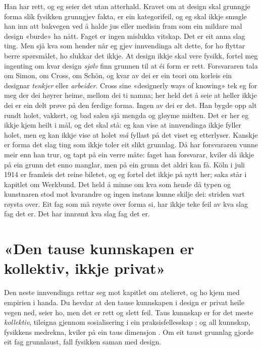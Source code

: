 Han har rett, og eg seier det utan atterhald. Kravet om at design skal grunngje forma slik fysikken grunngjev fakta, er ein kategorifeil, og eg skal ikkje smugle han inn att bakvegen ved å halde jus eller medisin fram som ein mildare mal design «burde» ha nått. Faget er ingen mislukka vitskap. Det er eit anna slag ting. Men sjå kva som hender når eg gjev innvendinga alt dette, for ho flyttar berre spørsmålet, ho slukkar det ikkje. At design ikkje skal vere fysikk, fortel meg ingenting om kvar design \emph{sjølv} finn grunnen til at éi form er rett. Forsvararen tala om Simon, om Cross, om Schön, og kvar av dei er ein teori om korleis ein designar \emph{tenkjer} eller \emph{arbeider}. Cross sine «designerly ways of knowing» tek eg for meg der dei høyrer heime, mellom dei ti namna; her held det å seie at heller ikkje dei er ein delt prøve på den ferdige forma. Ingen av dei er det. Han bygde opp alt rundt holet, vakkert, og bad salen sjå mengda og gløyme midten. Det er her eg ikkje kjem heilt i mål, og det skal stå: eg kan vise at innvendinga ikkje fyller holet, men eg kan ikkje vise at holet \emph{må} fyllast på det viset eg etterlyser. Kanskje er forma det slag ting som ikkje toler eit slikt grunnlag. Då har forsvararen vunne meir enn han trur, og tapt på ein verre måte: faget han forsvarar, kviler då ikkje på ein grunn det enno manglar, men på ein grunn det aldri kan få. Köln i juli 1914 er framleis det reine biletet, og eg fortel det ikkje på nytt her; saka står i kapitlet om Werkbund. Det held å minne om kva som hende då typen og kunstnaren stod mot kvarandre og ingen instans kunne skilje dei: striden vart røysta over. Eit fag som må røyste over forma si, har ikkje teke feil av kva slag fag det er. Det har innrømt kva slag fag det er.

\section{«Den tause kunnskapen er kollektiv, ikkje privat»}

Den neste innvendinga rettar seg mot kapitlet om atelieret, og ho kjem med empirien i handa. Du hevdar at den tause kunnskapen i design er privat heile vegen ned, seier ho, men det er rett og slett feil. Taus kunnskap er for det meste \emph{kollektiv}, tileigna gjennom sosialisering i ein praksisfellesskap \autocite{collins2010tacit}; og all kunnskap, fysikkens medrekna, kviler på ein taus dimensjon \autocite{polanyi1966tacit}. Om eit taust grunnlag gjorde eit fag grunnlaust, fall fysikken saman med design.

